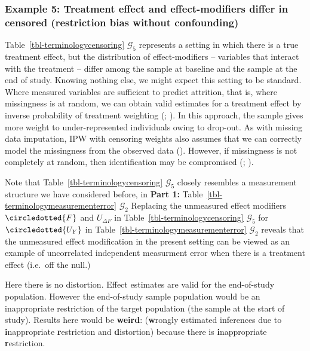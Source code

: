 \documentclass[
  single column]{article}
\begin{document}
\subsubsection{Example 5: Treatment effect and effect-modifiers differ
in censored (restriction bias without
confounding)}\label{example-5-treatment-effect-and-effect-modifiers-differ-in-censored-restriction-bias-without-confounding}

Table~\ref{tbl-terminologycensoring} \(\mathcal{G}_5\) represents a
setting in which there is a true treatment effect, but the distribution
of effect-modifiers -- variables that interact with the treatment --
differ among the sample at baseline and the sample at the end of study.
Knowing nothing else, we might expect this setting to be standard. Where
measured variables are sufficient to predict attrition, that is, where
missingness is at random, we can obtain valid estimates for a treatment
effect by inverse probability of treatment weighting
(;
). In this approach,
the sample gives more weight to under-represented individuals owing to
drop-out. As with missing data imputation, IPW with censoring weights
also assumes that we can correctly model the missingness from the
observed data ().
However, if missingness is not completely at random, then identification
may be compromised (; ).

Note that Table~\ref{tbl-terminologycensoring} \(\mathcal{G}_5\) closely
resembles a measurement structure we have considered before, in
\textbf{Part 1:} Table~\ref{tbl-terminologymeasurementerror}
\(\mathcal{G}_2\) Replacing the unmeasured effect modifiers
\(\circledotted{F}\) and \(U_{\Delta F}\) in
Table~\ref{tbl-terminologycensoring} \(\mathcal{G}_5\) for
\(\circledotted{U_Y}\) in Table~\ref{tbl-terminologymeasurementerror}
\(\mathcal{G}_2\) reveals that the unmeasured effect modification in the
present setting can be viewed as an example of uncorrelated independent
measurment error when there is a treatment effect (i.e.~off the null.)

Here there is no distortion. Effect estimates are valid for the
end-of-study population. However the end-of-study sample population
would be an inappropriate restriction of the target population (the
sample at the start of study). Results here would be \textbf{weird}:
(\textbf{w}rongly \textbf{e}stimated inferences due to
\textbf{i}nappropriate \textbf{r}estriction and \textbf{d}istortion)
because there is \textbf{i}nappropriate \textbf{r}estriction.
\end{document}

